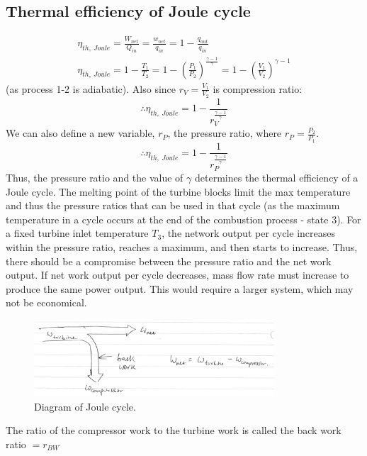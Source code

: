 \documentclass[class=report, crop=false, 12pt,a4paper]{standalone}
\begin{document}
\subsection{Thermal efficiency of Joule cycle}
\begin{gather}
  \eta_{th, \ Joule} = \frac{W_{net}}{Q_{in}} = \frac{w_{net}}{q_{in}} = 1 - \frac{q_{out}}{q_{in}}\\
  \eta_{th, \ Joule} = 1- \frac{T_1}{T_2} = 1 - \left( \frac{P_1}{P_2} \right)^{\frac{\gamma - 1}{\gamma}} = 1 - \left( \frac{V_1}{V_2} \right)^{\gamma -1}
\end{gather}
(as process 1-2 is adiabatic). Also since $r_V = \frac{V_1}{V_2}$ is compression ratio:
\begin{equation}
  \therefore \eta_{th, \ Joule} = 1 - \frac{1}{r_V^{\frac{\gamma -1}{\gamma}}}
\end{equation}
We can also define a new variable, $r_P$, the pressure ratio, where $r_P = \frac{P_2}{P_1}$.
\begin{equation}
  \therefore \eta_{th, \ Joule} = 1 - \frac{1}{r_P^{\frac{\gamma -1}{\gamma}}}
\end{equation}
Thus, the pressure ratio and the value of $\gamma$ determines the thermal efficiency of a Joule cycle. The melting point of the turbine blocks limit the max temperature and thus the pressure ratios that can be used in that cycle (as the maximum temperature in a cycle occurs at the end of the combustion process - state 3). For a fixed turbine inlet temperature $T_3$, the network output per cycle increases within the pressure ratio, reaches a maximum, and then starts to increase. Thus, there should be a compromise between the pressure ratio and the net work output. If net work output per cycle decreases, mass flow rate must increase to produce the same power output. This would require a larger system, which may not be economical.
\begin{figure}
  \centering
  \includegraphics[width = 0.8\textwidth]{../img/JouleCycleDiagram}
  \caption{Diagram of Joule cycle.}
\end{figure}
The ratio of the compressor work to the turbine work is called the back work ratio $= r_{BW}$
\end{document}
